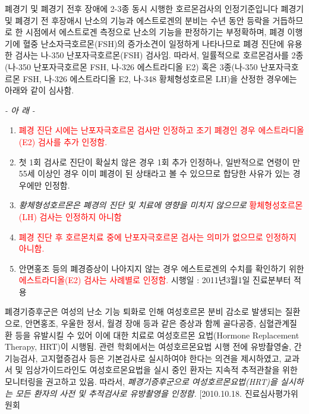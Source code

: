 {
폐경기 및 폐경기 전후 장애에 2-3종 동시 시행한 호르몬검사의 인정기준입니다
폐경기 및 폐경기 전\cntrdot{} 후장애시 난소의 기능과 에스트로겐의 분비는 수년 동안 등락을 거듭하므로 한 시점에서 에스트로겐 측정으로 난소의 기능을 판정하기는 부정확하며, 폐경 이행기에 혈중 난소자극호르몬(FSH)의 증가소견이 일정하게 나타나므로 폐경 진단에 유용한 검사는 나-350 난포자극호르몬(FSH) 검사임. 따라서, 일률적으로 호르몬검사를 2종(나-350 난포자극호르몬 FSH, 나-326 에스트라디올 E2) 혹은 3종(나-350 난포자극호르몬 FSH, 나-326 에스트라디올 E2, 나-348 황체형성호르몬 LH)을 산정한 경우에는 아래와 같이 심사함.
\begin{center}\emph{- 아 래 -}\end{center}
\begin{enumerate}[가.]\tightlist
\item \textcolor{red}{폐경 진단 시에는 난포자극호르몬 검사만 인정하고 조기 폐경인 경우 에스트라디올(E2) 검사를 추가 인정함.}
\item 첫 1회 검사로 진단이 확실치 않은 경우 1회 추가 인정하나, 일반적으로 연령이 만55세 이상인 경우 이미 폐경이 된 상태라고 볼 수 있으므로 합당한 사유가 있는 경우에만 인정함.
\item \emph{황체형성호르몬은 폐경의 진단 및 치료에 영향을 미치지 않으므로} \textcolor{red}{황체형성호르몬(LH) 검사는 인정하지 아니함}
\item \textcolor{red}{폐경 진단 후 호르몬치료 중에 난포자극호르몬 검사는 의미가 없으므로 인정하지 아니함.}
\item 안면홍조 등의 폐경증상이 나아지지 않는 경우 에스트로겐의 수치를 확인하기 위한 \textcolor{red}{에스트라디올(E2) 검사는 사례별로 인정함.} 시행일 : 2011년3월1일 진료분부터 적용
\end{enumerate}
 
폐경기증후군은 여성의 난소 기능 퇴화로 인해 여성호르몬 분비 감소로 발생되는 질환으로, 안면홍조, 우울한 정서, 월경 장애 등과 같은 증상과 함께 골다공증, 심혈관계질환 등을 유발시킬 수 있어 이에 대한 치료로 여성호르몬 요법(Hormone Replacement Therapy, HRT)이 시행됨. 관련 학회에서는 여성호르몬요법 시행 전에 유방촬영술, 간기능검사, 고지혈증검사 등은 기본검사로 실시하여야 한다는 의견을 제시하였고, 교과서 및 임상가이드라인도 여성호르몬요법을 실시 중인 환자는 지속적 추적관찰을 위한 모니터링을 권고하고 있음. 따라서, \emph{폐경기증후군으로 여성호르몬요법(HRT)을 실시하는 모든 환자의 사전 및 추적검사로 유방촬영을 인정함.} [2010.10.18. 진료심사평가위원회
}
